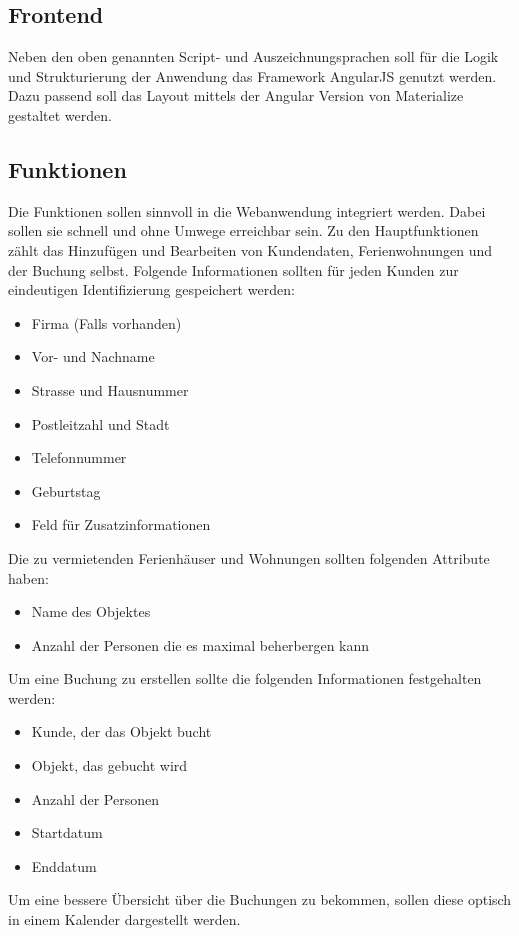 \subsection{Frontend}
Neben den oben genannten Script- und Auszeichnungsprachen soll für die Logik und Strukturierung der Anwendung das Framework AngularJS genutzt werden. Dazu passend soll das Layout mittels der Angular Version von Materialize gestaltet werden. 

\subsection{Funktionen}
Die Funktionen sollen sinnvoll in die Webanwendung integriert werden. Dabei sollen sie schnell und ohne Umwege erreichbar sein. Zu den Hauptfunktionen zählt das Hinzufügen und Bearbeiten von Kundendaten, Ferienwohnungen und der Buchung selbst. 
Folgende Informationen sollten für jeden Kunden zur eindeutigen Identifizierung gespeichert werden:
\begin{itemize} 
\item Firma (Falls vorhanden)
\item Vor- und Nachname
\item Strasse und Hausnummer
\item Postleitzahl und Stadt
\item Telefonnummer
\item Geburtstag 
\item Feld für Zusatzinformationen
\end{itemize}

Die zu vermietenden Ferienhäuser und Wohnungen sollten folgenden Attribute haben:
\begin{itemize} 
\item Name des Objektes
\item Anzahl der Personen die es maximal beherbergen kann
\end{itemize}

Um eine Buchung zu erstellen sollte die folgenden Informationen festgehalten werden:
\begin{itemize} 
\item Kunde, der das Objekt bucht
\item Objekt, das gebucht wird
\item Anzahl der Personen
\item Startdatum
\item Enddatum
\end{itemize}

Um eine bessere Übersicht über die Buchungen zu bekommen, sollen diese optisch in einem Kalender dargestellt werden.


